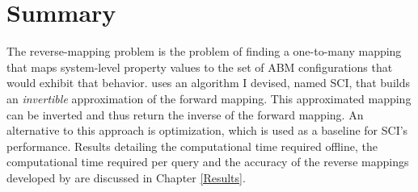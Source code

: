 \section{Summary}
The reverse-mapping problem is the problem of finding a one-to-many mapping that maps system-level property values to the set of ABM configurations that would exhibit that behavior.
\fw uses an algorithm I devised, named SCI, that builds an \textit{invertible} approximation of the forward mapping.
This approximated mapping can be inverted and thus return the inverse of the forward mapping.
An alternative to this approach is optimization, which is used as a baseline for SCI's performance.
Results detailing the computational time required offline, the computational time required per query and the accuracy of the reverse mappings developed by \fw are discussed in Chapter \ref{Results}.
